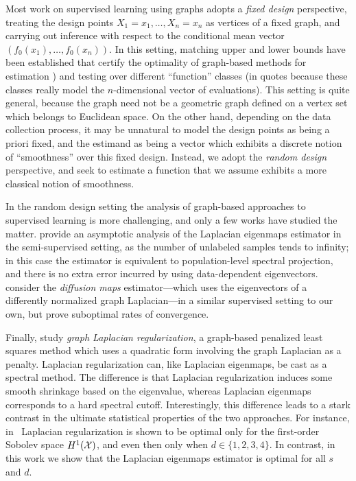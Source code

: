 Most work on supervised learning using graphs adopts a \emph{fixed design} perspective, treating the design points $X_1 = x_1,\ldots,X_n = x_n$ as vertices of a fixed graph, and carrying out inference with respect to the conditional mean vector $(f_0(x_1),\ldots,f_0(x_n))$. In this setting, matching upper and lower bounds have been established that certify the optimality of graph-based methods for estimation \citep{wang2016,hutter2016,sadhanala16,sadhanala17,kirichenko2017,kirichenko2018}) and testing \citep{sharpnack2010identifying,sharpnack2013b,sharpnack2013,sharpnack2015} over different ``function'' classes (in quotes because these classes really model the $n$-dimensional vector of evaluations). This setting is quite general, because the graph need not be a geometric graph defined on a vertex set which belongs to Euclidean space. On the other hand, depending on the data collection process, it may be unnatural to model the design points as being a priori fixed, and the estimand as being a vector which exhibits a discrete notion of ``smoothness'' over this fixed design. Instead, we adopt the \emph{random design} perspective, and seek to estimate a function that we assume exhibits a more classical notion of smoothness. 

In the random design setting the analysis of graph-based approaches to supervised learning is more challenging, and only a few works have studied the matter. \cite{zhou2011} provide an asymptotic analysis of the Laplacian eigenmaps estimator in the semi-supervised setting, as the number of unlabeled samples tends to infinity; in this case the estimator is equivalent to population-level spectral projection, and there is no extra error incurred by using data-dependent eigenvectors. \cite{lee2016} consider the \emph{diffusion maps} estimator---which uses the eigenvectors of a differently normalized graph Laplacian---in a similar supervised setting to our own, but prove suboptimal rates of convergence. 

Finally, \citet{trillos2020,green2021} study \emph{graph Laplacian regularization}, a graph-based penalized least squares method which uses a quadratic form involving the graph Laplacian as a penalty. Laplacian regularization can, like Laplacian eigenmaps, be cast as a spectral method. The difference is that Laplacian regularization induces some smooth shrinkage based on the eigenvalue, whereas Laplacian eigenmaps corresponds to a hard spectral cutoff. Interestingly, this difference leads to a stark contrast in the ultimate statistical properties of the two approaches. For instance, in~\cite{green2021} Laplacian regularization is shown to be optimal only for the first-order Sobolev space $H^1(\mathcal{X})$, and even then only when $d \in \{1,2,3,4\}$. In contrast, in this work we show that the Laplacian eigenmaps estimator is optimal for all $s$ and $d$.

